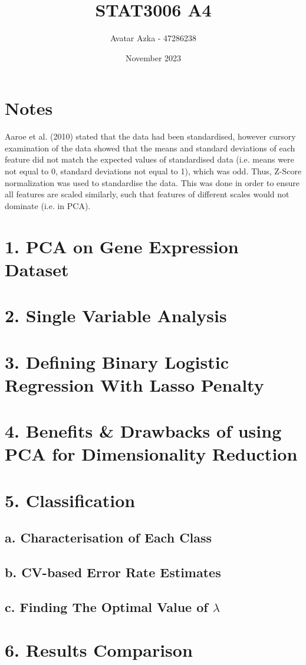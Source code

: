 \documentclass{article}
\title{STAT3006 A4}
\author{Avatar Azka - 47286238}
\date{November 2023}
\begin{document}
\maketitle
\tableofcontents
\newpage
\section{Notes}
Aaroe et al. (2010) stated that the data had been standardised, however cursory examination of the data showed that the means and standard deviations of each feature did not match the expected values of standardised data (i.e. means were not equal to 0, standard deviations not equal to 1), which was odd. Thus, Z-Score normalization was used to standardise the data. This was done in order to ensure all features are scaled similarly, such that features of different scales would not dominate (i.e. in PCA). 

\section{1. PCA on Gene Expression Dataset}


\section{2. Single Variable Analysis}

\section{3. Defining Binary Logistic Regression With Lasso Penalty}

\section{4. Benefits \& Drawbacks of using PCA for Dimensionality Reduction}

\section{5. Classification}

\subsection{a. Characterisation of Each Class}

\subsection{b. CV-based Error Rate Estimates}

\subsection{c. Finding The Optimal Value of $\lambda$}

\section{6. Results Comparison}
\end{document}
